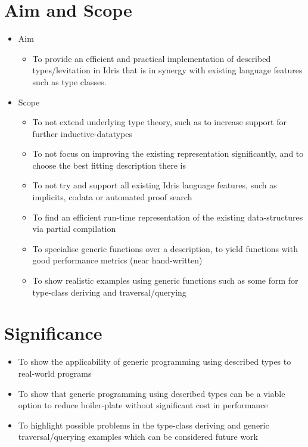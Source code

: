 \documentclass{ituthesis}
\begin{document}
\section{Aim and Scope}
\label{sec:AimandScope}
\begin{itemize}
  \item Aim
    \begin{itemize}
      \item To provide an efficient and practical implementation of described types/levitation in Idris that is in synergy with existing language features
        such as type classes.
    \end{itemize}
  \item Scope
    \begin{itemize}
      \item To not extend underlying type theory, such as to increase support for further inductive-datatypes
      \item To not focus on improving the existing representation significantly, and to choose the best fitting description there is
      \item To not try and support all existing Idris language features, such as implicits, codata or automated proof search
      \item To find an efficient run-time representation of the existing data-structures via partial compilation
      \item To specialise generic functions over a description, to yield functions with good performance metrics (near hand-written)
      \item To show realistic examples using generic functions such as some form for type-class deriving and traversal/querying
    \end{itemize}
\end{itemize}
\section{Significance}
\label{sec:Significance}
\begin{itemize}
  \item To show the applicability of generic programming using described types to real-world programs
  \item To show that generic programming using described types can be a viable option to reduce boiler-plate without significant cost in performance
  \item To highlight possible problems in the type-class deriving and generic traversal/querying examples which can be considered future work
\end{itemize}
\end{document}
